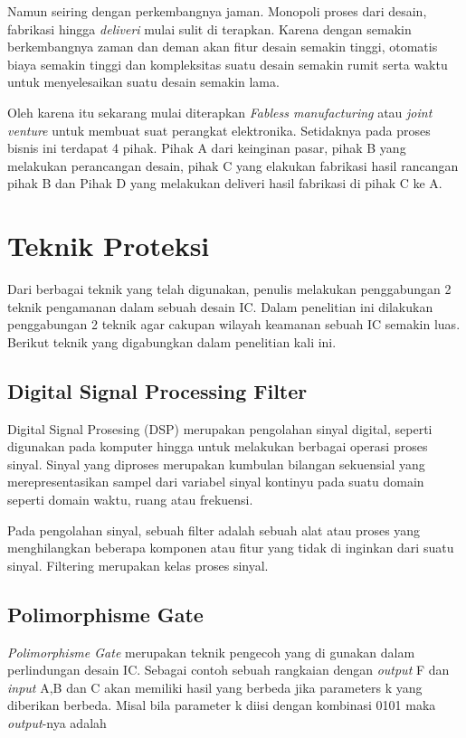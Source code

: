Namun seiring dengan perkembangnya jaman. Monopoli proses dari desain, fabrikasi hingga \textit{deliveri} mulai sulit di terapkan. Karena dengan semakin berkembangnya zaman dan deman akan fitur desain semakin tinggi, otomatis biaya semakin tinggi dan kompleksitas suatu desain semakin rumit serta waktu untuk menyelesaikan suatu desain semakin lama.

Oleh karena itu sekarang mulai diterapkan \textit{Fabless manufacturing} atau \textit{joint venture} untuk membuat suat perangkat elektronika. Setidaknya pada proses bisnis ini terdapat 4 pihak. Pihak A dari keinginan pasar, pihak B yang melakukan perancangan desain, pihak C yang elakukan fabrikasi hasil rancangan pihak B dan Pihak D yang melakukan deliveri hasil fabrikasi di pihak C ke A.

% 

\section{Teknik Proteksi}
Dari berbagai teknik yang telah digunakan, penulis melakukan penggabungan 2 teknik pengamanan dalam sebuah desain IC. Dalam penelitian ini dilakukan penggabungan 2 teknik agar cakupan wilayah keamanan sebuah IC semakin luas. Berikut teknik yang digabungkan dalam penelitian kali ini.

\subsection{Digital Signal Processing Filter}
Digital Signal Prosesing (DSP) merupakan pengolahan sinyal digital, seperti digunakan pada komputer hingga untuk melakukan berbagai operasi proses sinyal. Sinyal yang diproses merupakan kumbulan bilangan sekuensial yang merepresentasikan sampel dari variabel sinyal kontinyu pada suatu domain seperti domain waktu, ruang atau frekuensi.

Pada pengolahan sinyal, sebuah filter adalah sebuah alat atau proses yang menghilangkan beberapa komponen atau fitur yang tidak di inginkan dari suatu sinyal. Filtering merupakan kelas proses sinyal.

\subsection{Polimorphisme Gate}
\textit{Polimorphisme Gate} merupakan teknik pengecoh yang di gunakan dalam perlindungan desain IC. Sebagai contoh sebuah rangkaian dengan \textit{output} F dan \textit{input} A,B dan C akan memiliki hasil yang berbeda jika parameters k yang diberikan berbeda. Misal bila parameter k diisi dengan kombinasi 0101 maka \textit{output}-nya adalah


